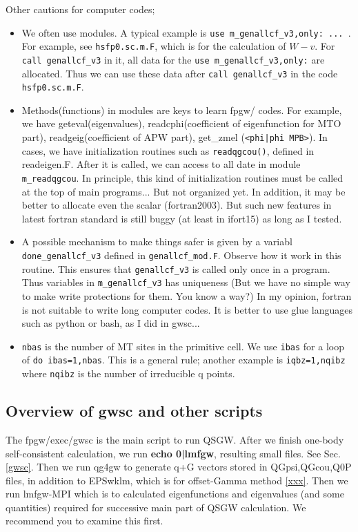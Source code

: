 \documentclass[a4paper,10pt,epsf,fleqn]{article}
\newcommand{\exe}[1]{{\bf #1}\index{#1}}
\newcommand{\io}[1]{{\sf  #1}\index{#1}}
\newcommand{\raw}[1]{{\tt #1}}
\begin{document}
Other cautions for computer codes;
\begin{itemize}
\item 
We often use modules. A typical example is \verb#use m_genallcf_v3,only: ... #. For example, see \raw{hsfp0.sc.m.F}, which is for the calculation of $W-v$.
For \verb#call genallcf_v3# in it, all data for the 
\verb#use m_genallcf_v3,only:# are allocated. Thus we can use these data
after \verb#call genallcf_v3# in the code \raw{hsfp0.sc.m.F}.
\item
Methods(functions) in modules are keys to learn fpgw/ codes.
For example, we have geteval(eigenvalues), 
readcphi(coefficient of eigenfunction for MTO part),
readgeig(coefficient of APW part), get\_zmel (\verb#<phi|phi MPB>#).
In cases, we have initialization routines such as
\raw{readqgcou()}, defined in \io{readeigen.F}.
After it is called, we can access to all date in module \verb#m_readqgcou#.
In principle, this kind of initialization routines must be called
at the top of main programs... But not organized yet.
In addition, it may be better to allocate even the scalar (fortran2003).
But such new features in latest fortran standard is still buggy
(at least in ifort15) as long as I tested.
\item
A possible mechanism to make things safer 
is given by a variabl \verb#done_genallcf_v3# defined in \verb#genallcf_mod.F#.
Observe how it work in this routine.
This ensures that \verb#genallcf_v3# is called only once in a program.
Thus variables in \verb#m_genallcf_v3# has uniqueness
(But we have no simple way to make write protections for them. 
You know a way?)
In my opinion, fortran is not suitable to write long computer codes.
It is better to use glue languages such as python or bash, as I did in gwsc...
\item
\verb#nbas# is the number of MT sites in the primitive cell.
We use \verb#ibas# for a loop of \verb#do ibas=1,nbas#.
This is a general rule; another example is \verb#iqbz=1,nqibz#
where \verb#nqibz# is the number of irreducible q points.
\end{itemize}

\subsection{Overview of gwsc and other scripts}
The fpgw/exec/gwsc is the main script to run QSGW.
After we finish one-body self-consistent calculation, 
we run \exe{echo 0|lmfgw}, resulting small files.
See Sec.\ref{gwsc}. Then we run qg4gw to generate q+G vectors
stored in \io{QGpsi,QGcou,Q0P} files, in addition to EPSwklm, which is for offset-Gamma method \ref{xxx}.
Then we run lmfgw-MPI which is to calculated eigenfunctions
and eigenvalues (and some quantities) required for successive
main part of QSGW calculation.
We recommend you to examine this first.
\end{document}
